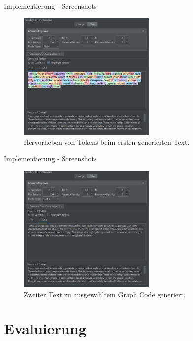 \documentclass[t]{beamer}
\begin{document}
\begin{frame}{Implementierung - Screenshots}

  \begin{figure}
    \includegraphics[width=0.6\textwidth]{images/right_text_two_exps_1_high}
    \caption{Hervorheben von Tokens beim ersten generierten Text.}
  \end{figure}

\end{frame}

\begin{frame}{Implementierung - Screenshots}

  \begin{figure}
    \includegraphics[width=0.6\textwidth]{images/right_text_two_exps_2}
    \caption{Zweiter Text zu ausgewähltem Graph Code generiert.}
  \end{figure}

\end{frame}

\section{Evaluierung}
\end{document}
